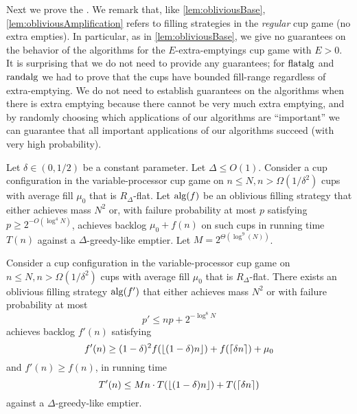 Next we prove the . We remark
that, like \cref{lem:obliviousBase},
\cref{lem:obliviousAmplification} refers to filling strategies in
the \emph{regular} cup game (no extra empties). In particular, as
in \cref{lem:obliviousBase}, we give no guarantees on the
behavior of the algorithms for the $E$-extra-emptyings cup game
with $E > 0$. It is surprising that we do not need to provide
any guarantees; for $\operatorname{\text{\textup{flatalg}}}$ and $\operatorname{\text{\textup{randalg}}}$ we had to prove
that the cups have bounded fill-range regardless of
extra-emptying. We do not need to establish guarantees on the
algorithms when there is extra emptying because
there cannot be very much extra emptying, and by randomly
choosing which applications of our algorithms are
\enquote{important} we can guarantee that all important
applications of our algorithms succeed (with very high
probability).

\begin{lemma}
  \label{lem:obliviousAmplification} 
  Let $\delta \in (0, 1/2)$ be a constant parameter. Let $\Delta
  \le O(1)$. Consider a cup configuration
  in the variable-processor cup game on $n \le N, n >
  \Omega(1/\delta^2)$ cups with average fill $\mu_0$ that is
  $R_\Delta$-flat. Let $\operatorname{\text{\textup{alg}}}(f)$ be an oblivious filling strategy
  that either achieves mass $N^2$ or, with failure probability at
  most $p$ satisfying $p\ge 2^{-O(\log^4 N)}$, achieves backlog $\mu_0 + f(n)$ on such cups
  in running time $T(n)$ against a $\Delta$-greedy-like emptier.
  Let $M = 2^{\Theta(\log^9 (N))}$.

  Consider a cup configuration in the variable-processor cup game
  on $n \le N, n > \Omega(1/\delta^2)$ cups with average fill
  $\mu_0$ that is $R_\Delta$-flat. There exists an oblivious
  filling strategy $\operatorname{\text{\textup{alg}}}(f')$ that either achieves mass $N^2$ or
  with failure probability at most 
  $$p' \le np + 2^{-\log^8 N}$$
  achieves backlog $f'(n)$ satisfying 
  $$f'(n) \ge (1-\delta)^2 f(\left\lfloor (1-\delta)n \right\rfloor) + f(\left\lceil \delta n \right\rceil) + \mu_0$$ 
  and $f'(n) \ge f(n)$, in running time 
  $$T'(n) \le Mn\cdot T(\left\lfloor (1-\delta)n \right\rfloor) + T(\left\lceil \delta n \right\rceil)$$
  against a $\Delta$-greedy-like emptier.
\end{lemma}

